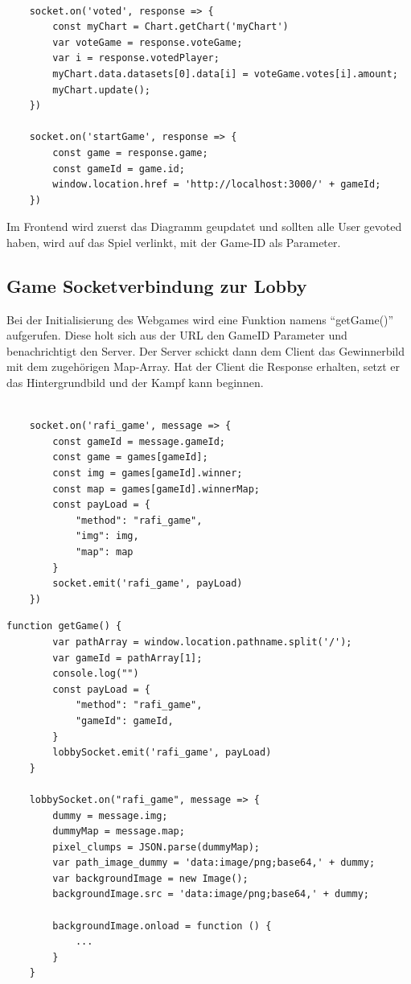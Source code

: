 \begin{lstlisting}[language=html,caption=User voted Client]

    socket.on('voted', response => {
        const myChart = Chart.getChart('myChart')
        var voteGame = response.voteGame;
        var i = response.votedPlayer;
        myChart.data.datasets[0].data[i] = voteGame.votes[i].amount;
        myChart.update();
    })

    socket.on('startGame', response => {
        const game = response.game;
        const gameId = game.id;
        window.location.href = 'http://localhost:3000/' + gameId;
    })
\end{lstlisting}
Im Frontend wird zuerst das Diagramm geupdatet und sollten alle User gevoted haben, wird auf das Spiel verlinkt, mit der Game-ID als Parameter.

\subsection{Game Socketverbindung zur Lobby}
Bei der Initialisierung des Webgames wird eine Funktion namens ``getGame()'' aufgerufen. Diese holt sich aus der URL den GameID Parameter und benachrichtigt den Server.
Der Server schickt dann dem Client das Gewinnerbild mit dem zugehörigen Map-Array.
Hat der Client die Response erhalten, setzt er das Hintergrundbild und der Kampf kann beginnen.
\begin{lstlisting}[language=html,caption=Webgame Socket Server]
    
    socket.on('rafi_game', message => {
        const gameId = message.gameId;
        const game = games[gameId];
        const img = games[gameId].winner;
        const map = games[gameId].winnerMap;
        const payLoad = {
            "method": "rafi_game",
            "img": img,
            "map": map
        }
        socket.emit('rafi_game', payLoad)
    })

\end{lstlisting}

\begin{lstlisting}[language=html,caption=Webgame Socket Client]
    function getGame() {
        var pathArray = window.location.pathname.split('/');
        var gameId = pathArray[1];
        console.log("")
        const payLoad = {
            "method": "rafi_game",
            "gameId": gameId,
        }
        lobbySocket.emit('rafi_game', payLoad)
    }

    lobbySocket.on("rafi_game", message => {
        dummy = message.img;
        dummyMap = message.map;
        pixel_clumps = JSON.parse(dummyMap);
        var path_image_dummy = 'data:image/png;base64,' + dummy;
        var backgroundImage = new Image();
        backgroundImage.src = 'data:image/png;base64,' + dummy;
    
        backgroundImage.onload = function () {
            ...
        }
    }
\end{lstlisting}

